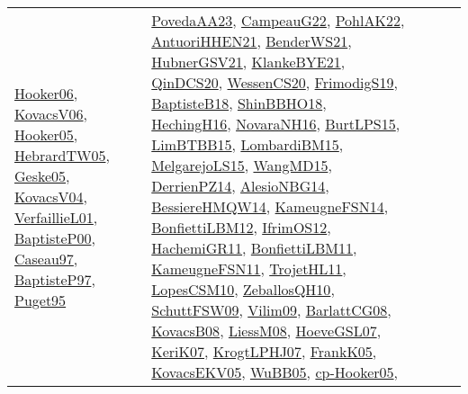 {\begin{longtable}{lp{3cm}>{\raggedright}p{6cm}>{\raggedright}p{6cm}p{8cm}}
\href{articles/Hooker06.pdf}{Hooker06}\cite{Hooker06}, \href{papers/KovacsV06.pdf}{KovacsV06}\cite{KovacsV06}, \href{articles/Hooker05.pdf}{Hooker05}\cite{Hooker05}, \href{papers/HebrardTW05.pdf}{HebrardTW05}\cite{HebrardTW05}, \href{papers/Geske05.pdf}{Geske05}\cite{Geske05}, \href{papers/KovacsV04.pdf}{KovacsV04}\cite{KovacsV04}, \href{papers/VerfaillieL01.pdf}{VerfaillieL01}\cite{VerfaillieL01}, \href{articles/BaptisteP00.pdf}{BaptisteP00}\cite{BaptisteP00}, \href{papers/Caseau97.pdf}{Caseau97}\cite{Caseau97}, \href{papers/BaptisteP97.pdf}{BaptisteP97}\cite{BaptisteP97}, \href{papers/Puget95.pdf}{Puget95}\cite{Puget95} & \href{papers/PovedaAA23.pdf}{PovedaAA23}\cite{PovedaAA23}, \href{articles/CampeauG22.pdf}{CampeauG22}\cite{CampeauG22}, \href{articles/PohlAK22.pdf}{PohlAK22}\cite{PohlAK22}, \href{papers/AntuoriHHEN21.pdf}{AntuoriHHEN21}\cite{AntuoriHHEN21}, \href{papers/BenderWS21.pdf}{BenderWS21}\cite{BenderWS21}, \href{articles/HubnerGSV21.pdf}{HubnerGSV21}\cite{HubnerGSV21}, \href{papers/KlankeBYE21.pdf}{KlankeBYE21}\cite{KlankeBYE21}, \href{articles/QinDCS20.pdf}{QinDCS20}\cite{QinDCS20}, \href{papers/WessenCS20.pdf}{WessenCS20}\cite{WessenCS20}, \href{papers/FrimodigS19.pdf}{FrimodigS19}\cite{FrimodigS19}, \href{articles/BaptisteB18.pdf}{BaptisteB18}\cite{BaptisteB18}, \href{articles/ShinBBHO18.pdf}{ShinBBHO18}\cite{ShinBBHO18}, \href{papers/HechingH16.pdf}{HechingH16}\cite{HechingH16}, \href{articles/NovaraNH16.pdf}{NovaraNH16}\cite{NovaraNH16}, \href{papers/BurtLPS15.pdf}{BurtLPS15}\cite{BurtLPS15}, \href{papers/LimBTBB15.pdf}{LimBTBB15}\cite{LimBTBB15}, \href{papers/LombardiBM15.pdf}{LombardiBM15}\cite{LombardiBM15}, \href{papers/MelgarejoLS15.pdf}{MelgarejoLS15}\cite{MelgarejoLS15}, \href{articles/WangMD15.pdf}{WangMD15}\cite{WangMD15}, \href{papers/DerrienPZ14.pdf}{DerrienPZ14}\cite{DerrienPZ14}, \href{papers/AlesioNBG14.pdf}{AlesioNBG14}\cite{AlesioNBG14}, \href{papers/BessiereHMQW14.pdf}{BessiereHMQW14}\cite{BessiereHMQW14}, \href{articles/KameugneFSN14.pdf}{KameugneFSN14}\cite{KameugneFSN14}, \href{papers/BonfiettiLBM12.pdf}{BonfiettiLBM12}\cite{BonfiettiLBM12}, \href{papers/IfrimOS12.pdf}{IfrimOS12}\cite{IfrimOS12}, \href{articles/HachemiGR11.pdf}{HachemiGR11}\cite{HachemiGR11}, \href{papers/BonfiettiLBM11.pdf}{BonfiettiLBM11}\cite{BonfiettiLBM11}, \href{papers/KameugneFSN11.pdf}{KameugneFSN11}\cite{KameugneFSN11}, \href{articles/TrojetHL11.pdf}{TrojetHL11}\cite{TrojetHL11}, \href{articles/LopesCSM10.pdf}{LopesCSM10}\cite{LopesCSM10}, \href{articles/ZeballosQH10.pdf}{ZeballosQH10}\cite{ZeballosQH10}, \href{papers/SchuttFSW09.pdf}{SchuttFSW09}\cite{SchuttFSW09}, \href{papers/Vilim09.pdf}{Vilim09}\cite{Vilim09}, \href{papers/BarlattCG08.pdf}{BarlattCG08}\cite{BarlattCG08}, \href{articles/KovacsB08.pdf}{KovacsB08}\cite{KovacsB08}, \href{articles/LiessM08.pdf}{LiessM08}\cite{LiessM08}, \href{papers/HoeveGSL07.pdf}{HoeveGSL07}\cite{HoeveGSL07}, \href{papers/KeriK07.pdf}{KeriK07}\cite{KeriK07}, \href{papers/KrogtLPHJ07.pdf}{KrogtLPHJ07}\cite{KrogtLPHJ07}, \href{papers/FrankK05.pdf}{FrankK05}\cite{FrankK05}, \href{papers/KovacsEKV05.pdf}{KovacsEKV05}\cite{KovacsEKV05}, \href{papers/WuBB05.pdf}{WuBB05}\cite{WuBB05}, \href{papers/cp-Hooker05.pdf}{cp-Hooker05}\cite{cp-Hooker05}, 
\end{longtable}}
